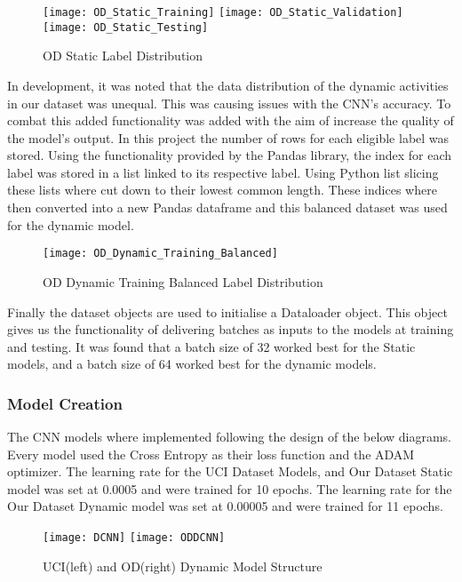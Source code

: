 \begin{figure}[h]
\centering
\texttt{[image: OD\_Static\_Training]}\hfill
\texttt{[image: OD\_Static\_Validation]}\hfill
\texttt{[image: OD\_Static\_Testing]}
\caption{OD Static Label Distribution}
\label{fig:OD_Static_Distribution}
\end{figure}

In development, it was noted that the data distribution of the dynamic activities in our dataset was unequal.
This was causing issues with the CNN's accuracy.
To combat this added functionality was added with the aim of increase the quality of the model's output.
In this project the number of rows for each eligible label was stored.
Using the functionality provided by the Pandas library, the index for each label was stored in a list linked to its respective label.
Using Python list slicing these lists where cut down to their lowest common length.
These indices where then converted into a new Pandas dataframe and this balanced dataset was used for the dynamic model.

\begin{figure}[h]
\centering
\texttt{[image: OD\_Dynamic\_Training\_Balanced]}\hfill
\caption{OD Dynamic Training Balanced Label Distribution}
\label{fig:BalancedTrain}
\end{figure}

Finally the dataset objects are used to initialise a Dataloader object.
This object gives us the functionality of delivering batches as inputs to the models at training and testing.
It was found that a batch size of 32 worked best for the Static models, and a batch size of 64 worked best for the dynamic models.

\subsubsection{Model Creation}
The CNN models where implemented following the design of the below diagrams.
Every model used the Cross Entropy as their loss function and the ADAM optimizer.
The learning rate for the UCI Dataset Models, and Our Dataset Static model was set at 0.0005 and were trained for 10 epochs.
The learning rate for the Our Dataset Dynamic model was set at 0.00005 and were trained for 11 epochs.

\begin{figure}[h]
\centering
\texttt{[image: DCNN]}\hfill
\texttt{[image: ODDCNN]}\hfill
\caption{UCI(left) and OD(right) Dynamic Model Structure}
\label{fig:Dynamic_Models}
\end{figure}

